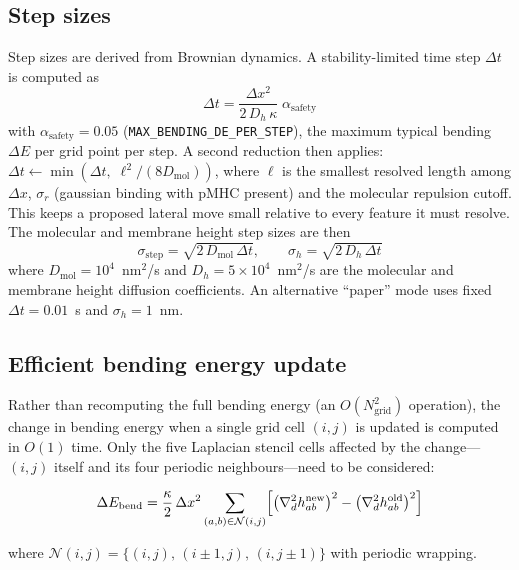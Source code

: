 \documentclass[11pt,a4paper]{article}
\begin{document}
\subsection{Step sizes}

Step sizes are derived from Brownian dynamics.  A stability-limited
time step $\Delta t$ is computed as
\begin{equation}
  \Delta t = \frac{\Delta x^2}{2\,D_h\,\kappa}\;\alpha_\text{safety}
\end{equation}
with $\alpha_\text{safety}=0.05$ (\texttt{MAX\_BENDING\_DE\_PER\_STEP}), the
maximum typical bending $\Delta E$ per grid point per step.  A second reduction
then applies: $\Delta t \leftarrow \min(\Delta t,\;\ell^2/(8 D_\text{mol}))$,
where $\ell$ is the smallest resolved length among $\Delta x$, $\sigma_r$
(gaussian binding with pMHC present) and the molecular repulsion cutoff.  This
keeps a proposed lateral move small relative to every feature it must resolve.  The molecular and
membrane height step sizes are then
\begin{equation}
  \sigma_\text{step} = \sqrt{2\,D_\text{mol}\,\Delta t},
  \qquad
  \sigma_h = \sqrt{2\,D_h\,\Delta t}
\end{equation}
where $D_\text{mol}=10^4$~nm$^2$/s and $D_h=5\times10^4$~nm$^2$/s
are the molecular and membrane height diffusion coefficients.
An alternative ``paper'' mode uses fixed $\Delta t = 0.01$~s and
$\sigma_h = 1$~nm.


\subsection{Efficient bending energy update}

Rather than recomputing the full bending energy (an $O(N_\text{grid}^2)$
operation), the change in bending energy when a single grid cell
$(i,j)$ is updated is computed in $O(1)$ time.  Only the five
Laplacian stencil cells affected by the change---$(i,j)$ itself and
its four periodic neighbours---need to be considered:

\begin{equation}
  \Delta E_\text{bend}
  = \frac{\kappa}{2}\,\Delta x^2
    \sum_{(a,b)\in\mathcal{N}(i,j)}
    \Bigl[\bigl(\nabla^2_d h_{ab}^\text{new}\bigr)^2
          - \bigl(\nabla^2_d h_{ab}^\text{old}\bigr)^2\Bigr]
\end{equation}

\noindent
where $\mathcal{N}(i,j) = \{(i,j),\,(i\pm1,j),\,(i,j\pm1)\}$ with
periodic wrapping.
\end{document}
